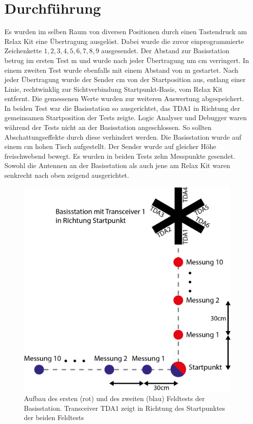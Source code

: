 \section{Durchführung}
Es wurden  im selben Raum von diversen Positionen durch einen Tastendruck am Relax Kit eine Übertragung ausgelöst. Dabei wurde die zuvor einprogrammierte Zeichenkette $1,2,3,4,5,6,7,8,9$ ausgesendet. Der Abstand zur Basisstation betrug im ersten Test  \unit[3,30]{m} und wurde nach jeder Übertragung um \unit[30]{cm} verringert. 
In einem zweiten Test wurde ebenfalls mit einem Abstand von \unit[3,30]{m} gestartet.  Nach jeder Übertragung wurde der Sender \unit[30]{cm}  von der Startposition aus, entlang einer  Linie, rechtwinklig zur Sichtverbindung Startpunkt-Basis, vom Relax Kit entfernt. Die gemessenen Werte wurden zur weiteren Auswertung abgespeichert.
In beiden Test war die Basisstation so ausgerichtet, das TDA1 in Richtung der gemeinsamen Startposition der Tests zeigte. Logic Analyser und Debugger waren während der Tests nicht an der Basisstation angeschlossen. So sollten Abschattungseffekte durch diese verhindert werden. Die Basisstation wurde auf einem \unit[70]{cm} hohen Tisch aufgestellt. Der Sender wurde auf gleicher Höhe freischwebend bewegt. Es wurden in beiden Tests zehn Messpunkte gesendet. Sowohl die Antennen an der Basisstation als auch jene am Relax Kit waren senkrecht nach oben zeigend ausgerichtet.
\begin{figure}[h]
\centering
\includegraphics[width=0.7\linewidth]{"Abbildungen/Aufbau Feldtest/Aufbau Feldtest"}
\caption[Aufbau des Testszenarios]{Aufbau des ersten (rot) und des zweiten (blau) Feldtests der Basisstation. Transceiver TDA1 zeigt in Richtung des Startpunktes der beiden Feldtests}
\label{fig:aufbau-feldtest}
\end{figure}


